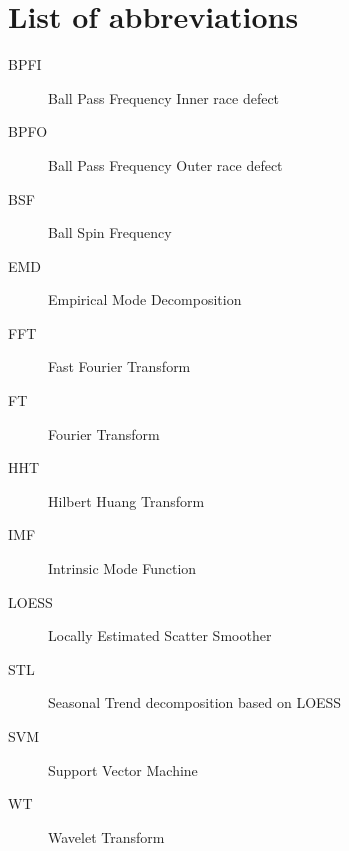 \documentclass[../Main/thesis.tex]{subfiles}
\begin{document}
\chapter*{List of abbreviations}
\begin{description}
\item[BPFI] Ball Pass Frequency Inner race defect
\item[BPFO] Ball Pass Frequency Outer race defect
\item[BSF] Ball Spin Frequency
\item[EMD] Empirical Mode Decomposition
\item[FFT] Fast Fourier Transform
\item[FT] Fourier Transform
\item[HHT] Hilbert Huang Transform
\item[IMF] Intrinsic Mode Function
\item[LOESS] Locally Estimated Scatter Smoother
\item[STL] Seasonal Trend decomposition based on LOESS
\item[SVM] Support Vector Machine
\item[WT] Wavelet Transform


\end{description}

\blankpage
\end{document}
